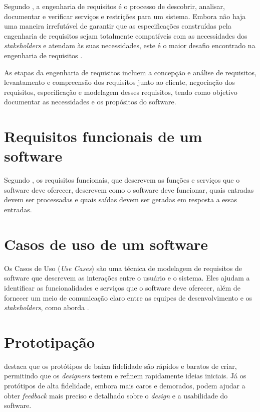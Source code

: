 Segundo \cite{kotonya1998requirements}, a engenharia de requisitos é o processo de descobrir, analisar, documentar e verificar serviços e restrições para um sistema. Embora não haja uma maneira irrefutável de garantir que as especificações construídas pela engenharia de requisitos sejam totalmente compatíveis com as necessidades dos \textit{stakeholders} e atendam às suas necessidades, este é o maior desafio encontrado na engenharia de requisitos \cite{pressman2016engenharia}. 

As etapas da engenharia de requisitos incluem a concepção e análise de requisitos, levantamento e compreensão dos requisitos junto ao cliente, negociação dos requisitos, especificação e modelagem desses requisitos, tendo como objetivo documentar as necessidades e os propósitos do software.

\section{Requisitos funcionais de um software}\label{sec:req_func}
Segundo \cite{pressman2016engenharia}, os requisitos funcionais, que descrevem as funções e serviços que o software deve oferecer, descrevem como o software deve funcionar, quais entradas devem ser processadas e quais saídas devem ser geradas em resposta a essas entradas. 

\section{Casos de uso de um software}\label{sec:req_func}
Os Casos de Uso (\textit{Use Cases}) são uma técnica de modelagem de requisitos de software que descrevem as interações entre o usuário e o sistema. Eles ajudam a identificar as funcionalidades e serviços que o software deve oferecer, além de fornecer um meio de comunicação claro entre as equipes de desenvolvimento e os \textit{stakeholders}, como aborda \cite{martin2008agile}.

\section{Prototipação}\label{sec:prototipacao}
\cite{warfel2009prototyping} destaca que os protótipos de baixa fidelidade são rápidos e baratos de criar, permitindo que os \textit{designers} testem e refinem rapidamente ideias iniciais. Já os protótipos de alta fidelidade, embora mais caros e demorados, podem ajudar a obter \textit{feedback} mais preciso e detalhado sobre o \textit{design} e a usabilidade do software.


